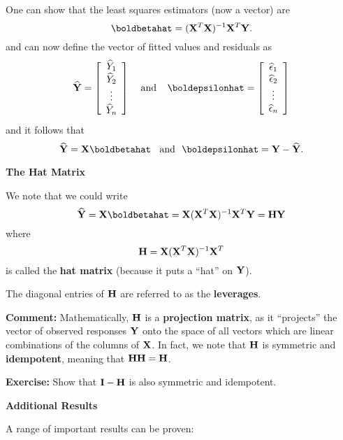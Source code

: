 \documentclass{report}
\begin{document}
\newpage

One can show that the least
squares estimators (now a vector) are
\[
   \boldbetahat = ({\bf X}^T{\bf X})^{-1} {\bf X}^T{\bf Y}.
\]
and can now define the vector of fitted values and residuals
as
\[
{\bf \widehat {\bf Y}} = \left[\begin{array}{c}\widehat Y_1\\\widehat Y_2\\ \vdots \\\widehat Y_n\end{array}\right]
\:\:\:\:\:\mbox{and}\:\:\:\:\:
\boldepsilonhat = \left[\begin{array}{c}\widehat \epsilon_1\\\widehat \epsilon_2\\ \vdots \\\widehat \epsilon_n\end{array}\right]
\]
and it follows that 
\[
   \widehat {\bf Y} = {\bf X} \boldbetahat \:\:\:\:\mbox{and}\:\:\: \boldepsilonhat= {\bf Y} - {\bf \widehat Y}.
\]



\newpage
{\bf The Hat Matrix}

We note that we could write
\[
   \widehat {\bf Y} = {\bf X} \boldbetahat = {\bf X} ({\bf X}^T{\bf X})^{-1} {\bf X}^T{\bf Y} = {\bf H} {\bf Y}
\]
where
\[
   {\bf H} = {\bf X} ({\bf X}^T{\bf X})^{-1} {\bf X}^T
\]
is called the {\bf hat matrix} (because it puts a ``hat'' on ${\bf Y}$).

The diagonal entries of ${\bf H}$ are referred to as the {\bf leverages}.

{\bf Comment:} 
Mathematically, ${\bf H}$ is a {\bf projection matrix}, as it ``projects'' the vector of observed
responses ${\bf Y}$ onto the space of all vectors which are linear combinations of the columns
of ${\bf X}$. In fact, we note that ${\bf H}$ is symmetric and {\bf idempotent}, meaning that ${\bf H} {\bf H} = {\bf H}$.

\textcolor{qcol}{{\bf Exercise:} Show that ${\bf I} - {\bf H}$ is also symmetric and idempotent.}


\newpage
{\bf Additional Results}

A range of important results can be proven:
\end{document}
